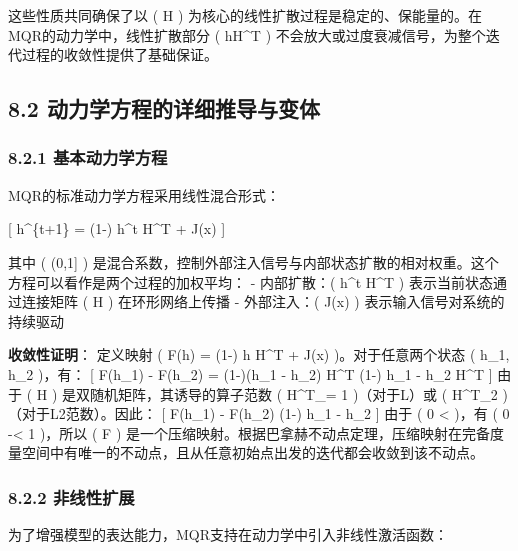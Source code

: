 \documentclass[
  12pt,
]{article}
\begin{document}
这些性质共同确保了以 ( H )
为核心的线性扩散过程是稳定的、保能量的。在MQR的动力学中，线性扩散部分 (
hH\^{}T ) 不会放大或过度衰减信号，为整个迭代过程的收敛性提供了基础保证。

\hypertarget{ux52a8ux529bux5b66ux65b9ux7a0bux7684ux8be6ux7ec6ux63a8ux5bfcux4e0eux53d8ux4f53}{%
\subsection{8.2
动力学方程的详细推导与变体}\label{ux52a8ux529bux5b66ux65b9ux7a0bux7684ux8be6ux7ec6ux63a8ux5bfcux4e0eux53d8ux4f53}}

\hypertarget{ux57faux672cux52a8ux529bux5b66ux65b9ux7a0b-3}{%
\subsubsection{8.2.1
基本动力学方程}\label{ux57faux672cux52a8ux529bux5b66ux65b9ux7a0b-3}}

MQR的标准动力学方程采用线性混合形式：

{[} h\^{}\{t+1\} = (1-\alpha) h\^{}t H\^{}T + \alpha J(x) {]}

其中 ( \alpha \in (0,1{]} )
是混合系数，控制外部注入信号与内部状态扩散的相对权重。这个方程可以看作是两个过程的加权平均：
- 内部扩散：( h\^{}t H\^{}T ) 表示当前状态通过连接矩阵 ( H )
在环形网络上传播 - 外部注入：( J(x) )
表示输入信号对系统的持续驱动

\textbf{收敛性证明}： 定义映射 ( F(h) = (1-\alpha) h H\^{}T +
\alpha J(x) )。对于任意两个状态 ( h\_1, h\_2 )，有： {[}
\textbar{}F(h\_1) - F(h\_2)\textbar{} =
\textbar(1-\alpha)(h\_1 - h\_2) H\^{}T\textbar{} \leq (1-\alpha)
\textbar h\_1 - h\_2\textbar{} \textbar H\^{}T\textbar{} {]} 由于 ( H )
是双随机矩阵，其诱导的算子范数 ( \textbar H\^{}T\textbar\_\infty = 1
)（对于L）或 ( \textbar H\^{}T\textbar\_2 
)（对于L2范数）。因此： {[} \textbar{}F(h\_1) -
F(h\_2)\textbar{} \leq (1-\alpha) \textbar h\_1 -
h\_2\textbar{} {]} 由于 ( 0 \textless{} \alpha {} )，有 ( 0
-\alpha \textless{} 1 )，所以 ( F )
是一个压缩映射。根据巴拿赫不动点定理，压缩映射在完备度量空间中有唯一的不动点，且从任意初始点出发的迭代都会收敛到该不动点。

\hypertarget{ux975eux7ebfux6027ux6269ux5c55-1}{%
\subsubsection{8.2.2
非线性扩展}\label{ux975eux7ebfux6027ux6269ux5c55-1}}

为了增强模型的表达能力，MQR支持在动力学中引入非线性激活函数：
\end{document}
